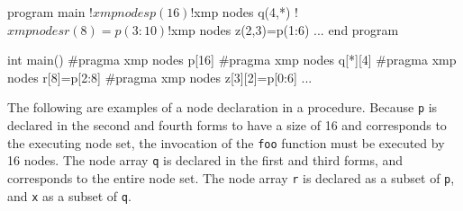 \vspace{0.5cm}

\begin{minipage}{0.45\hsize}
\begin{center}
\begin{XFexample}
      program main
!$xmp nodes p(16)
!$xmp nodes q(4,*)
!$xmp nodes r(8)=p(3:10)
!$xmp nodes z(2,3)=p(1:6)
      ...       
      end program 
\end{XFexample}
\end{center}
\end{minipage}
%
\begin{minipage}{0.45\hsize}
\begin{center}
\begin{XCexampleR}
int main() {
#pragma xmp nodes p[16]
#pragma xmp nodes q[*][4]
#pragma xmp nodes r[8]=p[2:8]
#pragma xmp nodes z[3][2]=p[0:6]
    ...
}
\end{XCexampleR}
\end{center}
\end{minipage}

\vspace{0.5cm}

%

The following are examples of a node declaration in a procedure.
Because {\tt p} is declared in the second and fourth forms to have a
size of 16 and
corresponds to the executing node set, the invocation of the {\tt foo}
function must be executed by 16 nodes.
%
The node array {\tt q} is declared in the first and third forms, and corresponds to
the entire node set. The node array {\tt r} is declared as a subset of
{\tt p}, and {\tt x} as a subset of {\tt q}.


